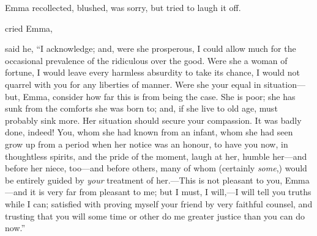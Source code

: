 Emma recollected, blushed, was sorry, but tried to laugh it off.



 cried Emma, 

 said he, “I acknowledge; and, were she prosperous, I could allow much for the occasional prevalence of the ridiculous over the good. Were she a woman of fortune, I would leave every harmless absurdity to take its chance, I would not quarrel with you for any liberties of manner. Were she your equal in situation---but, Emma, consider how far this is from being the case. She is poor; she has sunk from the comforts she was born to; and, if she live to old age, must probably sink more. Her situation should secure your compassion. It was badly done, indeed! You, whom she had known from an infant, whom she had seen grow up from a period when her notice was an honour, to have you now, in thoughtless spirits, and the pride of the moment, laugh at her, humble her---and before her niece, too---and before others, many of whom (certainly {\em some},) would be entirely guided by {\em your} treatment of her.---This is not pleasant to you, Emma---and it is very far from pleasant to me; but I must, I will,---I will tell you truths while I can; satisfied with proving myself your friend by very faithful counsel, and trusting that you will some time or other do me greater justice than you can do now.”

